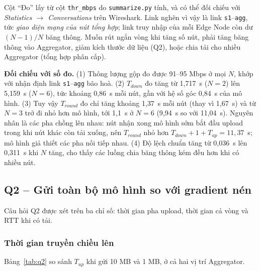 Cột ``Đo'' lấy từ cột \texttt{thr\_mbps} do \texttt{summarize.py} tính, và có thể đối chiếu với \emph{Statistics $\rightarrow$ Conversations} trên Wireshark. Link nghẽn vì vậy là link \texttt{s1}--\texttt{agg}, tức \emph{giao diện mạng của nút tổng hợp}; link truy nhập của mỗi Edge Node còn dư $(N-1)/N$ băng thông. Muốn rút ngắn vòng khi tăng số nút, phải tăng băng thông vào Aggregator, giảm kích thước dữ liệu (Q2), hoặc chia tải cho nhiều Aggregator (tổng hợp phân cấp).

\textbf{Đối chiếu với số đo.} (1) Thông lượng gộp đo được 91--95 Mbps ở mọi $N$, khớp với nhận định link \texttt{s1}--\texttt{agg} bão hoà. (2) $T_{down}$ đo tăng từ 1{,}717~s ($N = 2$) lên 5{,}159~s ($N = 6$), tức khoảng 0{,}86~s mỗi nút, gần với hệ số góc 0{,}84~s của mô hình. (3) Tuy vậy $T_{round}$ đo chỉ tăng khoảng 1{,}37~s mỗi nút (thay vì 1{,}67~s) và từ $N = 3$ trở đi nhỏ hơn mô hình, tới 1{,}1~s ở $N = 6$ (9{,}94~s so với 11{,}04~s). Nguyên nhân là các pha chồng lên nhau: nút nhận xong mô hình sớm bắt đầu upload trong khi nút khác còn tải xuống, nên $T_{round}$ nhỏ hơn $T_{down} + 1 + T_{up} = 11{,}37$~s; mô hình giả thiết các pha nối tiếp nhau. (4) Độ lệch chuẩn tăng từ 0{,}036~s lên 0{,}311~s khi $N$ tăng, cho thấy các luồng chia băng thông kém đều hơn khi có nhiều nút.

\subsection{Q2 -- Gửi toàn bộ mô hình so với gradient nén}
Câu hỏi Q2 được xét trên ba chỉ số: thời gian pha upload, thời gian cả vòng và RTT khi có tải.

\subsubsection{Thời gian truyền chiều lên}
Bảng~\ref{tab:q2} so sánh $T_{up}$ khi gửi 10 MB và 1 MB, ở cả hai vị trí Aggregator.

